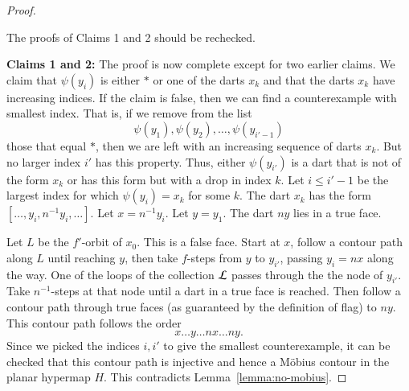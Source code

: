 \begin{proof}

\begin{note}%
The proofs of Claims 1 and 2 should be rechecked.
\end{note}

{\bf Claims 1 and 2:}
The proof is now complete except for two earlier claims.  We claim
that $\psi(y_i)$ is either $*$ or one of the darts $x_k$ and that the darts
$x_k$ have increasing indices.  If the claim is false, then
we can find a counterexample with smallest index.  That is, if we remove
from the list
   $$
   \psi(y_1),\psi(y_2),\ldots,\psi(y_{i'-1})
   $$
those that equal $*$, then we are left with an increasing sequence of 
darts $x_k$.  But no larger index $i'$ has this property.  Thus, either
$\psi(y_{i'})$ is a dart that is not of the form $x_k$ or has this form
but with a drop in index $k$.  Let $i\le i'-1$
be the largest index for which $\psi(y_i)=x_k$ for some $k$.
The dart $x_k$ has the form $[\ldots,y_i,n^{-1}y_i,\ldots]$.  Let $x=n^{-1}y_i$.
Let $y=y_1$.  The dart $n y$ lies in a true face.

Let $L$ be the $f'$-orbit of $x_0$.  This is a false face.
Start at $x$, follow a contour path along $L$ until reaching $y$, then
take $f$-steps from $y$ to $y_{i'}$, passing $y_i = n x$ along the way.
One of the loops of the collection ${\cal L}$ passes through the the node of $y_{i'}$.
Take $n^{-1}$-steps at that node until a dart in a true face is reached.  Then
follow a contour path through true faces (as guaranteed by the definition
of flag) to $n y$.  
This contour path follows the order
  $$
  x\ldots y \ldots n x\ldots n y.
  $$
Since we picked the indices $i,i'$ to give the smallest counterexample, it can be checked
that this contour path is injective and hence a M\"obius contour in 
the planar hypermap $H$.  
This contradicts Lemma~\ref{lemma:no-mobius}.
\end{proof}







